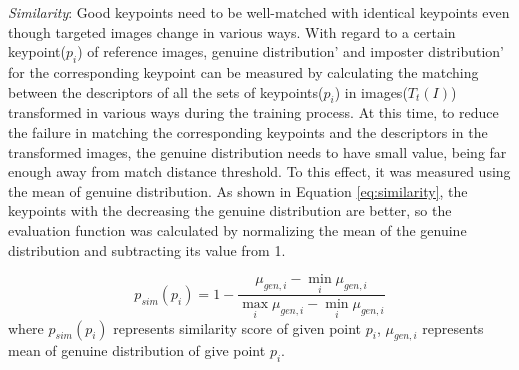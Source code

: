 
\textit{Similarity}: Good keypoints need to be well-matched with identical keypoints even though targeted images change in various ways. With regard to a certain keypoint($p_i$) of reference images, genuine distribution' and imposter distribution' for the corresponding keypoint can be measured by calculating the matching between the descriptors of all the sets of keypoints($p_i$) in images($T_t(I)$) transformed in various ways  during the training process. At this time, to reduce the failure in matching the corresponding keypoints and the descriptors in the transformed images, the genuine distribution needs to have small value, being far enough away from match distance threshold. To this effect, it was measured using the mean of genuine distribution. As shown in Equation \eqref{eq:similarity}, the keypoints with the decreasing the genuine distribution are better, so the evaluation function was calculated by normalizing the mean of the genuine distribution and subtracting its value from 1.  

\begin{equation} \label{eq:similarity}
p_{sim}(p_i) = 1 - \frac{\mu_{gen,i} - \min_i \mu_{gen,i}}{\max_i \mu_{gen, i} - \min_i \mu_{gen,i}}
\end{equation}	
where $p_{sim}(p_i)$ represents similarity score of given point $p_i$, $\mu_{gen, i}$ represents mean of genuine distribution of give point $p_i$. 


